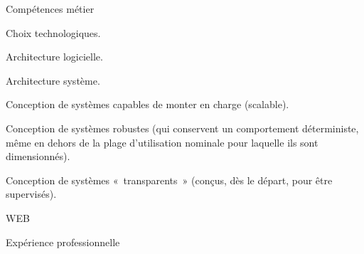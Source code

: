 \documentclass{cv}
\newlength{\interSectionTitleContentLength}
\newcommand{\mainSectionSeparator}[1]{
   \vspace{10pt}\par%
   \begin{tcolorbox}[notitle,
                     nobeforeafter, %
                     boxrule=0pt,
                     top=2pt,
                     bottom=2pt,
                     halign=center,
                     valign=center,
                     width=\textwidth,
                     colback={colorSection}]%
      #1%
   \end{tcolorbox}%
   \par%
}%
\newenvironment{sectionContent}{
   \vspace{\interSectionTitleContentLength}\par%
}{%
   \par%
}%
\newenvironment{packed_enum}{
   \begin{itemize}[topsep=0pt, itemsep=1pt, parsep=0pt, partopsep=0pt]%
}{\end{itemize}}
\begin{document}
   \mainSectionSeparator{Compétences métier}

   \begin{sectionContent}
      \begin{packed_enum}
         \item Choix technologiques.
         \item Architecture logicielle.
         \item Architecture système.
         \item Conception de systèmes capables de monter en charge (scalable).
         \item Conception de systèmes robustes (qui conservent un comportement déterministe, même en dehors de la plage d’utilisation nominale pour laquelle ils sont dimensionnés).
         \item Conception de systèmes « transparents » (conçus, dès le départ, pour être supervisés).
         \item WEB
      \end{packed_enum}
   \end{sectionContent}


   \newpage
   \mainSectionSeparator{Expérience professionnelle}
\end{document}

